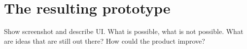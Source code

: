 \section{The resulting prototype}
Show screenshot and describe UI. What is possible, what is not possible. 
What are ideas that are still out there? 
How could the product improve?



